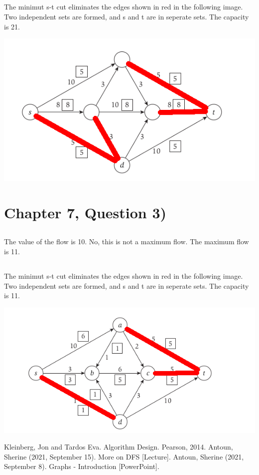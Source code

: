 \documentclass[11pt]{article}
\begin{document}
\subsection{}
The minimut s-t cut eliminates the edges shown in red in the following image. Two independent sets are formed, and s and t are in seperate sets. The capacity is 21.
\begin{center}
\includegraphics[keepaspectratio=true,scale=0.5]{9Cut.png}
\end{center}

\section{Chapter 7, Question 3)}
\subsection{}
The value of the flow is 10. No, this is not a maximum flow. The maximum flow is 11.
\subsection{}
The minimut s-t cut eliminates the edges shown in red in the following image. Two independent sets are formed, and s and t are in seperate sets. The capacity is 11.
\begin{center}
\includegraphics[keepaspectratio=true,scale=0.5]{10Cut.png}
\end{center}

\begin{thebibliography}{1}

 Kleinberg, Jon and Tardos Eva. Algorithm Design. Pearson, 2014. 
 Antoun, Sherine (2021, September 15). More on DFS [Lecture].
 Antoun, Sherine (2021, September 8). Graphs - Introduction [PowerPoint].

 \end{thebibliography}
\end{document}
